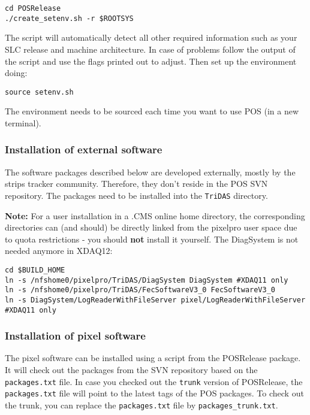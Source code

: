 \begin{verbatim}
cd POSRelease
./create_setenv.sh -r $ROOTSYS
\end{verbatim}

The script will automatically detect all other required information 
such as your SLC release and machine architecture.  In case of 
problems follow the output of the script and use the flags printed 
out to adjust.  Then set up the environment doing:

\begin{verbatim}
source setenv.sh
\end{verbatim}

The environment needs to be sourced each time you want to use POS 
(in a new terminal).

\subsubsection{Installation of external software}
The software packages described below are developed externally, 
mostly by the strips tracker community.  Therefore, they don't 
reside in the POS SVN repository.  The packages need to be installed 
into the {\tt TriDAS} directory.

\textbf{Note:} For a user installation in a .CMS online home 
directory, the corresponding directories can (and should) be 
directly linked from the pixelpro user space due to quota 
restrictions - you should \textbf{not} install it yourself.  The 
DiagSystem is not needed anymore in XDAQ12:

\begin{verbatim}
cd $BUILD_HOME
ln -s /nfshome0/pixelpro/TriDAS/DiagSystem DiagSystem #XDAQ11 only
ln -s /nfshome0/pixelpro/TriDAS/FecSoftwareV3_0 FecSoftwareV3_0
ln -s DiagSystem/LogReaderWithFileServer pixel/LogReaderWithFileServer #XDAQ11 only
\end{verbatim}

\subsubsection{Installation of pixel software}
The pixel software can be installed using a script from the 
POSRelease package.  It will check out the packages from the SVN 
repository based on the {\tt packages.txt} file.  In case you 
checked out the {\tt trunk} version of POSRelease, the 
{\tt packages.txt} file will point to the latest tags of the POS 
packages.  To check out the trunk, you can replace the 
{\tt packages.txt} file by {\tt packages\_trunk.txt}.

